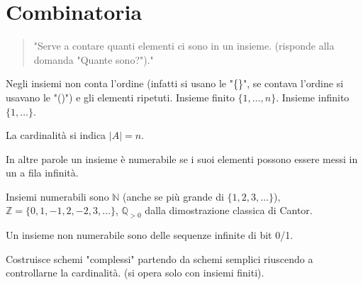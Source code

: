 \section{Combinatoria}

\begin{quotation}
	"Serve a contare quanti elementi ci sono in un insieme.
	(risponde alla domanda "Quante sono?")."
\end{quotation}

Negli insiemi non conta l'ordine (infatti si usano le "\{\}", se contava l'ordine si usavano le "()") e gli elementi ripetuti. Insieme finito $\{1, \dots, n\}$. Insieme infinito $\{1,\dots\}$.


La cardinalità si indica $|A|=n$.





In altre parole un insieme è numerabile se i suoi elementi possono essere messi in un a fila infinità.

Insiemi numerabili sono $\mathbb{N}$ (anche se più grande di $\{1,2,3,\dots\}$), $\mathbb{Z}=\{0,1,-1,2,-2,3,\dots\}$, $\mathbb{Q}_{>0}$ dalla dimostrazione classica di Cantor.

Un insieme non numerabile sono delle sequenze infinite di bit 0/1.


Costruisce schemi "complessi" partendo da schemi semplici riuscendo a controllarne la cardinalità. (si opera solo con insiemi finiti).


